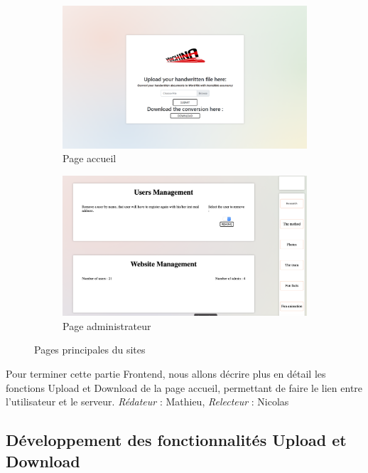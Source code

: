 \documentclass[oneside,a4paper,13pt]{article}
\begin{document}
\begin{figure}[H]
  \begin{subfigure}[b]{0.4\textwidth}
    \includegraphics[scale=0.22]{Images/accueil.png}
    \caption{Page accueil}
    \label{fig:f1}
  \end{subfigure}
  \hfill
  \begin{subfigure}[b]{0.4\textwidth}
    \includegraphics[scale=0.16]{Images/Admin.png}
    \caption{Page administrateur}
    \label{fig:f2}
  \end{subfigure}
  \caption{Pages principales du sites}
\end{figure}

Pour terminer cette partie  Frontend, nous allons décrire plus en détail les fonctions Upload et Download de la page accueil, permettant de faire le lien entre l'utilisateur et le serveur. 
\smallbreak\textit{Rédateur} : Mathieu, \textit{Relecteur} : Nicolas
\subsection{Développement des fonctionnalités Upload et Download}
\end{document}
